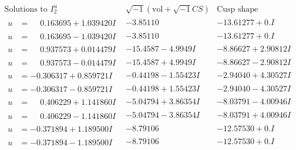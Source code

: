 \documentclass[1p]{elsarticle_modified}
\theoremstyle{definition}
\newcommand{\I}{\sqrt{-1}}
\begin{document}
$$\begin{array}{c|c|c}  
\text{Solutions to }I^u_{2}& \I (\text{vol} + \sqrt{-1}CS) & \text{Cusp shape}\\
 \hline 
\begin{aligned}
u &= \phantom{-}0.163695 + 1.039420 I\end{aligned}
 & -3.85110\phantom{ +0.000000I} & -13.61277 + 0. I\phantom{ +0.000000I} \\ \hline\begin{aligned}
u &= \phantom{-}0.163695 - 1.039420 I\end{aligned}
 & -3.85110\phantom{ +0.000000I} & -13.61277 + 0. I\phantom{ +0.000000I} \\ \hline\begin{aligned}
u &= \phantom{-}0.937573 + 0.014479 I\end{aligned}
 & -15.4587 - 4.9949 I & -8.86627 + 2.90812 I \\ \hline\begin{aligned}
u &= \phantom{-}0.937573 - 0.014479 I\end{aligned}
 & -15.4587 + 4.9949 I & -8.86627 - 2.90812 I \\ \hline\begin{aligned}
u &= -0.306317 + 0.859721 I\end{aligned}
 & -0.44198 - 1.55423 I & -2.94040 + 4.30527 I \\ \hline\begin{aligned}
u &= -0.306317 - 0.859721 I\end{aligned}
 & -0.44198 + 1.55423 I & -2.94040 - 4.30527 I \\ \hline\begin{aligned}
u &= \phantom{-}0.406229 + 1.141860 I\end{aligned}
 & -5.04794 + 3.86354 I & -8.03791 - 4.00946 I \\ \hline\begin{aligned}
u &= \phantom{-}0.406229 - 1.141860 I\end{aligned}
 & -5.04794 - 3.86354 I & -8.03791 + 4.00946 I \\ \hline\begin{aligned}
u &= -0.371894 + 1.189500 I\end{aligned}
 & -8.79106\phantom{ +0.000000I} & -12.57530 + 0. I\phantom{ +0.000000I} \\ \hline\begin{aligned}
u &= -0.371894 - 1.189500 I\end{aligned}
 & -8.79106\phantom{ +0.000000I} & -12.57530 + 0. I\phantom{ +0.000000I} \\ \hline\begin{aligned}

\end{aligned}
\end{array}$$
\end{document}
